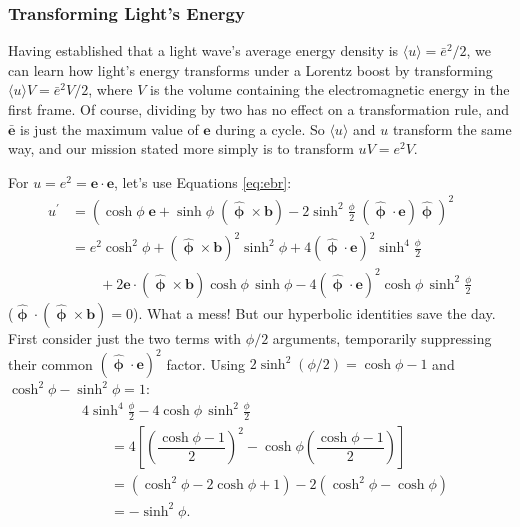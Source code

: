 \documentclass[12pt]{article}
\renewcommand{\vv}[1]{\mathbf{#1}}
\newcommand{\hatphi}{\bm{\hat{\upphi}}}
\begin{document}
\subsubsection{Transforming Light's Energy}

Having established that a light wave's average energy density is $\langle u \rangle = \bar{e}^2 / 2$, we can learn how light's energy transforms under a Lorentz boost by transforming $\langle u \rangle V = \bar{e}^2 V / 2$, where $V$ is the volume containing the electromagnetic energy in the first frame. Of course, dividing by two has no effect on a transformation rule, and $\bar{\vv e}$ is just the maximum value of $\vv e$ during a cycle. So $\langle u \rangle$ and $u$ transform the same way, and our mission stated more simply is to transform $uV = e^2 V$.

For $u = e^2 = \vv e \cdot \vv e$, let's use Equations \ref{eq:ebr}:
\begin{equation*}
\begin{aligned}
u^\prime &= \left( \cosh{\phi} \; \vv e + \sinh{\phi} \; (\hatphi \times \vv b) - 2 \sinh^2 \frac{\phi}{2} \; (\hatphi \cdot \vv e) \hatphi \right)^2 \\
&= e^2 \cosh^2{\phi} + (\hatphi \times \vv b)^2 \sinh^2{\phi} + 4(\hatphi \cdot \vv e)^2 \sinh^4{\frac{\phi}{2}} \\
& \qquad + 2 \vv e \cdot (\hatphi \times \vv b) \cosh{\phi} \, \sinh{\phi} - 4 (\hatphi \cdot \vv e)^2 \cosh{\phi} \,\sinh^2{\frac{\phi}{2}}
\end{aligned}
\end{equation*}
($\hatphi \cdot (\hatphi \times \vv b) = 0$). What a mess! But our hyperbolic identities save the day. First consider just the two terms with $\phi / 2$ arguments, temporarily suppressing their common $(\hatphi \cdot \vv e)^2$ factor. Using $2\sinh^2(\phi/2) = \cosh \phi - 1$ and $\cosh^2 \phi - \sinh^2 \phi = 1$:
\begin{equation*}
\begin{aligned}
& 4 \sinh^4{\frac{\phi}{2}} - 4 \cosh{\phi} \,\sinh^2{\frac{\phi}{2}} \\[2pt]
& \qquad  = 4 \left[ \left( \dfrac{\cosh{\phi} - 1}{2} \right)^2 - \cosh{\phi} \left( \dfrac{\cosh{\phi} - 1}{2} \right) \right] \\[4pt]
& \qquad = \left( \cosh^2{\phi} - 2 \cosh{\phi} + 1 \right) - 2 \left( \cosh^2{\phi} - \cosh{\phi} \right) \\[3pt]
& \qquad = - \sinh^2{\phi} .
\end{aligned}
\end{equation*}
\end{document}
